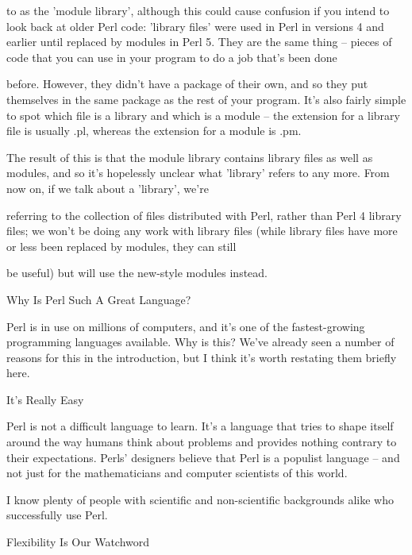 \documentclass[a4paper,11pt]{book}
\begin{document}
\noindent to as the 'module library', although this could cause confusion if you intend to look back at older Perl code: 'library files' were used in Perl in versions 4 and earlier until replaced by modules in Perl 5. They are the same thing -- pieces of code that you can use in your program to do a job that's been done

\noindent before. However, they didn't have a package of their own, and so they put themselves in the same package as the rest of your program. It's also fairly simple to spot which file is a library and which is a module -- the extension for a library file is usually .pl, whereas the extension for a module is .pm.

\noindent 

\noindent The result of this is that the module library contains library files as well as modules, and so it's hopelessly unclear what 'library' refers to any more. From now on, if we talk about a 'library', we're

\noindent referring to the collection of files distributed with Perl, rather than Perl 4 library files; we won't be doing any work with library files (while library files have more or less been replaced by modules, they can still

\noindent be useful) but will use the new-style modules instead.

\noindent 

\noindent 

\noindent Why Is Perl Such A Great Language?

\noindent Perl is in use on millions of computers, and it's one of the fastest-growing programming languages available. Why is this? We've already seen a number of reasons for this in the introduction, but I think it's worth restating them briefly here.

\noindent 

\noindent It's Really Easy

\noindent Perl is not a difficult language to learn. It's a language that tries to shape itself around the way humans think about problems and provides nothing contrary to their expectations. Perls' designers believe that Perl is a populist language -- and not just for the mathematicians and computer scientists of this world.

\noindent I know plenty of people with scientific and non-scientific backgrounds alike who successfully use Perl.

\noindent 

\noindent Flexibility Is Our Watchword
\end{document}
